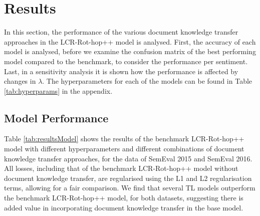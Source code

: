 \section{Results}
In this section, the performance of the various document knowledge transfer approaches in the LCR-Rot-hop++ model is analysed. First, the accuracy of each model is analysed, before we examine the confusion matrix of the best performing model compared to the benchmark, to consider the performance per sentiment. Last, in a sensitivity analysis it is shown how the performance is affected by changes in $\lambda$. The  hyperparameters for each of the models can be found in Table \ref{tab:hyperparams} in the appendix.


\subsection{Model Performance}

Table \ref{tab:resultsModel} shows the results of the benchmark LCR-Rot-hop++ model with different hyperparameters and different combinations of document knowledge transfer approaches, for the data of SemEval 2015 and SemEval 2016. All losses, including that of the benchmark LCR-Rot-hop++ model without document knowledge transfer, are regularised using the L1 and L2 regularisation terms, allowing for a fair comparison. We find that several TL models outperform the benchmark LCR-Rot-hop++ model, for both datasets, suggesting there is added value in incorporating document knowledge transfer in the base model.


